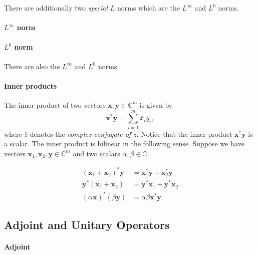 \documentclass[12pt]{article}
\newcommand{\bbC}{\mathbb{C}}
\renewcommand{\vec}[1]{\mathbf{#1}}
\theoremstyle{definition}
\theoremstyle{remark}
\numberwithin{equation}{section}
\begin{document}
There are additionally two \emph{special} $L$ norms which are the $L^\infty$ and $L^0$ norms.


\paragraph{$L^\infty$ norm}

\paragraph{$L^0$ norm}

There are also the $L^\infty$ and $L^0$ norms.

\paragraph{Inner products}%
\label{par:inner_products}

The inner product of two vectors $\vec{x}, \vec{y} \in \bbC^{m}$ is given by 
\begin{equation}
  \vec{x}^*\vec{y} = \sum_{i=1}^{m} \bar{x}_i y_i,
\end{equation}
where $\bar{z}$ denotes the \emph{complex conjugate of $z$}.   Notice that the inner product $\vec{x}^*\vec{y}$ is a scalar. The inner product is bilinear in the following sense. Suppose we have vectors $\vec{x}_1, \vec{x}_2, \vec{y}\in \bbC^m$ and two scalars $\alpha, \beta \in \bbC$. 

\begin{align}
  (\vec{x}_1 + \vec{x}_2)^*\vec{y} &= \vec{x}_1^*\vec{y} + \vec{x}_2^*\vec{y} \\
\vec{y}^*(\vec{x}_1 + \vec{x}_2) &= \vec{y}^*\vec{x}_1 + \vec{y}^*\vec{x}_2 \\
(\alpha \vec{x})^*(\beta \vec{y}) &= \bar{\alpha}\beta \vec{x}^*\vec{y}.
\end{align}

\subsection{Adjoint and Unitary Operators}%
\label{sub:adjoint_and_unitary_operators}

\paragraph{Adjoint}
\end{document}
